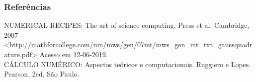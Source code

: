 \documentclass{beamer}
\begin{document}
					
					
					
					
					
					
					
					
					
\begin{frame}
\frametitle{Referências}
NUMERICAL RECIPES: The art of science computing. Press et al. Cambridge, 2007\\
<http://mathforcollege.com/nm/mws/gen/07int/mws\_gen\_int\_txt\_gaussquadrature.pdf> Acesso em 12-06-2019.\\
CÁLCULO NUMÉRICO: Aspectos teóricos e computacionais. Ruggiero e Lopes. Pearson, 2ed, São Paulo.
\end{frame}
\end{document}
